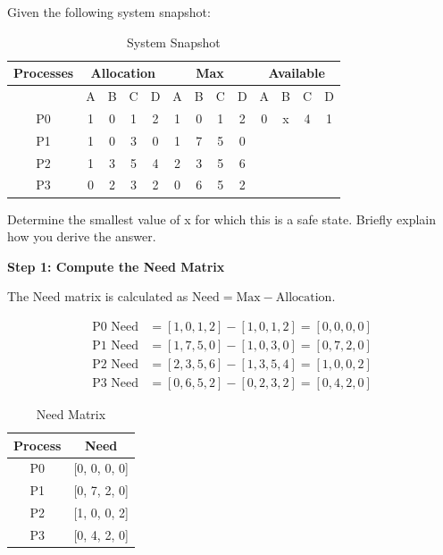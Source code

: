 \documentclass[../main.tex]{subfiles}
\begin{document}
Given the following system snapshot:

\begin{table}[h!]
    \centering
    \begin{tabular}{|c|cccc|cccc|cccc|}
        \hline
        \textbf{Processes} & \multicolumn{4}{c|}{\textbf{Allocation}} & \multicolumn{4}{c|}{\textbf{Max}} & \multicolumn{4}{c|}{\textbf{Available}} \\
        \hline
        & A & B & C & D & A & B & C & D & A & B & C & D \\
        \hline
        P0 & 1 & 0 & 1 & 2 & 1 & 0 & 1 & 2 & 0 & x & 4 & 1 \\
        P1 & 1 & 0 & 3 & 0 & 1 & 7 & 5 & 0 &  &  &  &  \\
        P2 & 1 & 3 & 5 & 4 & 2 & 3 & 5 & 6 &  &  &  &  \\
        P3 & 0 & 2 & 3 & 2 & 0 & 6 & 5 & 2 &  &  &  &  \\
        \hline
    \end{tabular}
    \caption{System Snapshot}
\end{table}

Determine the smallest value of x for which this is a safe state. Briefly explain how you derive the answer.

\solution

\textbf{Step 1: Compute the Need Matrix}  

The Need matrix is calculated as $\text{Need} = \text{Max} - \text{Allocation}$.

\[
\begin{aligned}
\text{P0 Need} &= [1, 0, 1, 2] - [1, 0, 1, 2] = [0, 0, 0, 0] \\
\text{P1 Need} &= [1, 7, 5, 0] - [1, 0, 3, 0] = [0, 7, 2, 0] \\
\text{P2 Need} &= [2, 3, 5, 6] - [1, 3, 5, 4] = [1, 0, 0, 2] \\
\text{P3 Need} &= [0, 6, 5, 2] - [0, 2, 3, 2] = [0, 4, 2, 0]
\end{aligned}
\]

\begin{table}[h!]
\centering
\begin{tabular}{|c|c|}
\hline
\textbf{Process} & \textbf{Need} \\
\hline
P0 & [0, 0, 0, 0] \\
P1 & [0, 7, 2, 0] \\
P2 & [1, 0, 0, 2] \\
P3 & [0, 4, 2, 0] \\
\hline
\end{tabular}
\caption{Need Matrix}
\end{table}
\end{document}
